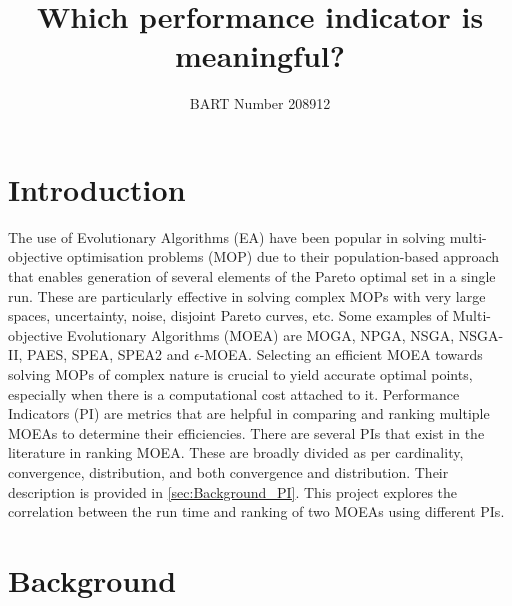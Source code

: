 \documentclass[sigconf,nonacm]{acmart}
\begin{document}
\title{Which performance indicator is meaningful?}
\author{BART Number 208912}

\begin{abstract}
	
\end{abstract}

\maketitle

\section{Introduction}
The use of Evolutionary Algorithms (EA) have been popular in solving multi-objective optimisation problems (MOP) due to their population-based approach that enables generation of several elements of the Pareto optimal set in a single run. These are particularly effective in solving complex MOPs with very large spaces, uncertainty, noise, disjoint Pareto curves, etc. Some examples of Multi-objective Evolutionary Algorithms (MOEA) are MOGA, NPGA, NSGA, NSGA-II, PAES, SPEA, SPEA2 and $\epsilon$-MOEA\cite{moea2007, deb2002}. Selecting an efficient MOEA towards solving MOPs of complex nature is crucial to yield accurate optimal points, especially when there is a computational cost attached to it. Performance Indicators (PI) are metrics that are helpful in comparing and ranking multiple MOEAs to determine their efficiencies. There are several PIs that exist in the literature in ranking MOEA. These are broadly divided as per cardinality, convergence, distribution, and both convergence and distribution. Their description is provided in \autoref{sec:Background_PI}. This project explores the correlation between the run time and ranking of two MOEAs using different PIs.

\section{Background}
\end{document}
